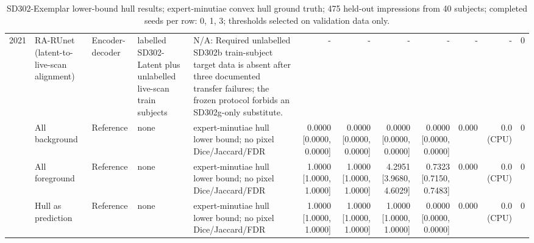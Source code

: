 \begin{table}[t]
\begin{tabular}{rllllrrrrrrr}
2021 & RA-RUnet (latent-to-live-scan alignment) & Encoder-decoder & labelled SD302-Latent plus unlabelled live-scan train subjects & N/A: Required unlabelled SD302b train-subject target data is absent after three documented transfer failures; the frozen protocol forbids an SD302g-only substitute. & - & - & - & - & - & - & 0 \\
 & All background & Reference & none & expert-minutiae hull lower bound; no pixel Dice/Jaccard/FDR & 0.0000 [0.0000, 0.0000] & 0.0000 [0.0000, 0.0000] & 0.0000 [0.0000, 0.0000] & 0.0000 [0.0000, 0.0000] & 0.000 & 0.0 (CPU) & 0 \\
 & All foreground & Reference & none & expert-minutiae hull lower bound; no pixel Dice/Jaccard/FDR & 1.0000 [1.0000, 1.0000] & 1.0000 [1.0000, 1.0000] & 4.2951 [3.9680, 4.6029] & 0.7323 [0.7150, 0.7483] & 0.000 & 0.0 (CPU) & 0 \\
 & Hull as prediction & Reference & none & expert-minutiae hull lower bound; no pixel Dice/Jaccard/FDR & 1.0000 [1.0000, 1.0000] & 1.0000 [1.0000, 1.0000] & 1.0000 [1.0000, 1.0000] & 0.0000 [0.0000, 0.0000] & 0.000 & 0.0 (CPU) & 0 \\
\bottomrule
\end{tabular}
\caption{SD302-Exemplar lower-bound hull results; expert-minutiae convex hull ground truth; 475 held-out impressions from 40 subjects; completed seeds per row: 0, 1, 3; thresholds selected on validation data only.}
\end{table}

